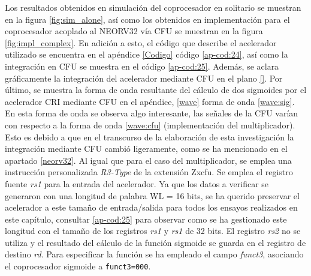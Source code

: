 Los resultados obtenidos en simulación del coprocesador en solitario se muestran en la figura \ref{fig:sim_alone}, así como los obtenidos en implementación para el coprocesador acoplado al NEORV32 vía CFU se muestran en la figura \ref{fig:impl_complex}.
En adición a esto, el código que describe el acelerador utilizado se encuentra en el apéndice \ref{Codigo} código \ref{ap-cod:24}, así como la integración en CFU se muestra en el código \ref{ap-cod:25}.
Además, se aclara gráficamente la integración del acelerador mediante CFU en el plano \ref{}. 
Por último, se muestra la forma de onda resultante del cálculo de dos sigmoides por el acelerador CRI mediante CFU en el apéndice, \ref{wave} forma de onda \ref{wave:sig}. 
En esta forma de onda se observa algo interesante, las señales de la CFU varían con respecto a la forma de onda \ref{wave:cfu} (implementación del multiplicador).
Esto es debido a que en el transcurso de la elaboración de esta investigación la integración mediante CFU cambió ligeramente, como se ha mencionado en el apartado \ref{neorv32}.
Al igual que para el caso del multiplicador, se emplea una instrucción personalizada \textit{R3-Type} de la extensión Zxcfu.
Se emplea el registro fuente \textit{rs1} para la entrada del acelerador.
Ya que los datos a verificar se generaron con una longitud de palabra WL = 16 bits, se ha querido preservar el acelerador a este tamaño de entrada/salida para todos los ensayos realizados en este capítulo, consultar \ref{ap-cod:25} para observar como se ha gestionado este longitud con el tamaño de los registros \textit{rs1} y \textit{rs1} de 32 bits. 
El registro \textit{rs2} no se utiliza y el resultado del cálculo de la función sigmoide se guarda en el registro de destino \textit{rd}.
Para especificar la función se ha empleado el campo \textit{funct3}, asociando el coprocesador sigmoide a \texttt{funct3=000}.


